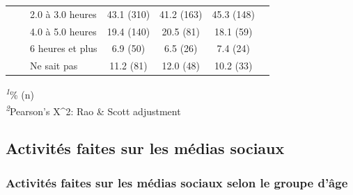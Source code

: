 \documentclass[
]{article}
\begin{document}
\begin{table}[!t]
\begin{tabular*}{\linewidth}{@{\extracolsep{\fill}}lcccc}
    2.0 à 3.0 heures & 43.1 (310) & 41.2 (163) & 45.3 (148) &  \\ 
    4.0 à 5.0 heures & 19.4 (140) & 20.5 (81) & 18.1 (59) &  \\ 
    6 heures et plus & 6.9 (50) & 6.5 (26) & 7.4 (24) &  \\ 
    Ne sait pas & 11.2 (81) & 12.0 (48) & 10.2 (33) &  \\ 
\bottomrule
\end{tabular*}
\begin{minipage}{\linewidth}
\textsuperscript{\textit{1}}\% (n)\\
\textsuperscript{\textit{2}}Pearson's X\^{}2: Rao \& Scott adjustment\\
\end{minipage}
\end{table}
\vspace{1cm}

\hypertarget{activituxe9s-faites-sur-les-muxe9dias-sociaux}{%
\subsection{Activités faites sur les médias
sociaux}\label{activituxe9s-faites-sur-les-muxe9dias-sociaux}}

\vspace{1cm}

\hypertarget{activituxe9s-faites-sur-les-muxe9dias-sociaux-selon-le-groupe-duxe2ge}{%
\subsubsection{Activités faites sur les médias sociaux selon le groupe
d'âge}\label{activituxe9s-faites-sur-les-muxe9dias-sociaux-selon-le-groupe-duxe2ge}}
\end{document}
